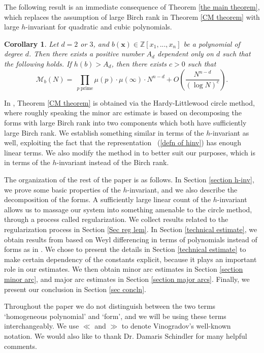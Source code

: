 \documentclass[12pt]{amsart}
\newtheorem{cor}[thm]{Corollary}
\theoremstyle{definition}
\theoremstyle{remark}
\numberwithin{equation}{section}
\begin{document}
The following result is an immediate consequence of Theorem \ref{the main theorem}, which replaces the assumption of large Birch rank
in Theorem \ref{CM theorem}
with large $h$-invariant for
quadratic and cubic polynomials.
\begin{cor}
\label{the main theorem 2}
Let $d = 2$ or $3$, and $b(\mathbf{x}) \in \mathbb{Z}[x_1, ..., x_n]$ be a polynomial of degree $d$.
Then there exists a positive number $A_{d}$ dependent only on $d$ such that the following holds.
If $h(b) > A_d$, then there exists $c>0$ such that
$$
\mathcal{M}_{b}(N) = \ \prod_{p \ \text{prime}} \mu(p) \cdot  \mu(\infty) \cdot N^{n-d} + O\left( \frac{N^{n-d}}{(\log N)^c } \right).
$$
\end{cor}

In \cite{CM}, Theorem \ref{CM theorem} is obtained via the Hardy-Littlewood circle method, where
roughly speaking the minor arc estimate is based on decomposing the forms with large Birch rank
into two components which both have sufficiently large Birch rank. We
establish something similar in terms of the $h$-invariant as well, exploiting the fact that the representation
~(\ref{defn of hinv}) has enough linear terms. We also modify the method in \cite{CM} to better suit our purposes, which
is in terms of the $h$-invariant instead of the Birch rank.

The organization of the rest of the paper is as follows. In Section \ref{section h-inv}, we prove some basic
properties of the $h$-invariant, and we also describe the decomposition of the forms.
A sufficiently large linear count of the $h$-invariant allows us to massage our system into something amenable to the circle method, through a process called regularization. We collect results related to the regularization process in Section \ref{Sec reg lem}.
In Section \ref{technical estimate}, we obtain results from \cite{S} based on Weyl differencing in terms of polynomials instead of forms as in \cite{S}. We chose to present the details in Section \ref{technical estimate} to make certain dependency
of the constants explicit, because it plays an important role in our estimates. We then obtain minor arc estimates in
Section \ref{section minor arc}, and major arc estimates in Section \ref{section major arcs}. Finally, we present our conclusion
in Section \ref{sec concln}.

Throughout the paper we do not distinguish between the two terms `homogeneous polynomial' and `form', and
we will be using these terms interchangeably. We use $\ll$ and $\gg$ to denote Vinogradov's well-known notation.
We would also like to thank Dr. Damaris Schindler for many helpful comments.
\end{document}
